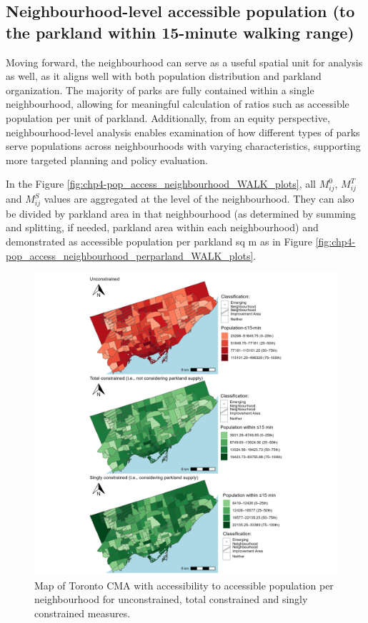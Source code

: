 \documentclass[
11pt, %
oneside, %
english, %
singlespacing, %
]{macthesis} %
\begin{document}
\subsection{Neighbourhood-level accessible population (to the parkland within 15-minute walking range)}\label{neighbourhood-level-accessible-population-to-the-parkland-within-15-minute-walking-range}

Moving forward, the neighbourhood can serve as a useful spatial unit for analysis as well, as it aligns well with both population distribution and parkland organization. The majority of parks are fully contained within a single neighbourhood, allowing for meaningful calculation of ratios such as accessible population per unit of parkland. Additionally, from an equity perspective, neighbourhood-level analysis enables examination of how different types of parks serve populations across neighbourhoods with varying characteristics, supporting more targeted planning and policy evaluation.

In the Figure \ref{fig:chp4-pop_access_neighbourhood_WALK_plots}, all \(M^0_{ij}\), \(M^T_{ij}\) and \(M^S_{ij}\) values are aggregated at the level of the neighbourhood. They can also be divided by parkland area in that neighbourhood (as determined by summing and splitting, if needed, parkland area within each neighbourhood) and demonstrated as accessible population per parkland sq m as in Figure \ref{fig:chp4-pop_access_neighbourhood_perparland_WALK_plots}.

\begin{figure}

{\centering \includegraphics[width=6in]{./data/figures/chp4-pop_access_neighbourhood_WALK_plots} 

}

\caption{\label{fig:chp4-pop_access_neighbourhood_WALK_plots}Map of Toronto CMA with accessibility to accessible population per neighbourhood for unconstrained, total constrained and singly constrained measures.}\label{fig:unnamed-chunk-71}
\end{figure}
\end{document}
